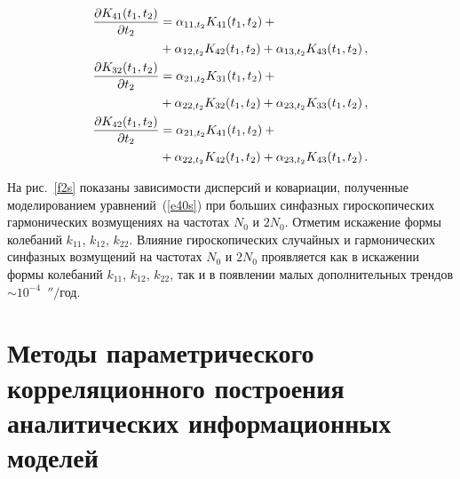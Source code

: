 \begin{multicols}{2}
\begin{align*}
\displaystyle\frac{\displaystyle \partial K_{41} (t_1, t_2)\mathstrut}{\displaystyle \partial t_2\mathstrut} &= \alpha_{11 , t_2} K_{41} (t_1, t_2)+{}\\
& + \alpha_{12, t_2} K_{42} (t_1, t_2) + \alpha_{13, t_2} K_{43} (t_1, t_2)\,,\notag\\
\displaystyle\frac{\displaystyle \partial K_{32} (t_1, t_2)\mathstrut}{\displaystyle \partial t_2\mathstrut} &= \alpha_{21 , t_2} K_{31} (t_1, t_2)+{}\\
& + \alpha_{22, t_2}K_{32} (t_1, t_2) + \alpha_{23, t_2} K_{33} (t_1, t_2)\,,\notag\\
\displaystyle\frac{\displaystyle \partial K_{42} (t_1, t_2)\mathstrut}{\displaystyle \partial t_2\mathstrut}& = \alpha_{21 , t_2} K_{41} (t_1, t_2)+{}\\
& + \alpha_{22, t_2}K_{42} (t_1, t_2) + \alpha_{23, t_2} K_{43} (t_1, t_2)\,.
 \end{align*}

На рис.~\ref{f2s} показаны зависимости дисперсий и ковариации,
полученные моделированием уравнений~(\ref{e40s}) при больших синфазных
гироскопических гармонических возмущениях на частотах $N_0 $ и
$2N_0$. Отметим искажение формы колебаний $k_{11}$, $k_{12}$, $k_{22}$.
Влияние гироскопических случайных и гармонических синфазных
возмущений на частотах $N_0$ и $2N_0$ проявляется как в искажении
формы колебаний $k_{11}$, $k_{12}$, $k_{22}$, так и в появлении малых
дополнительных трендов $\sim 10^{-4}$~$''/$год.


\section{Методы параметрического корреляционного построения
аналитических информационных моделей} %


\end{multicols}
